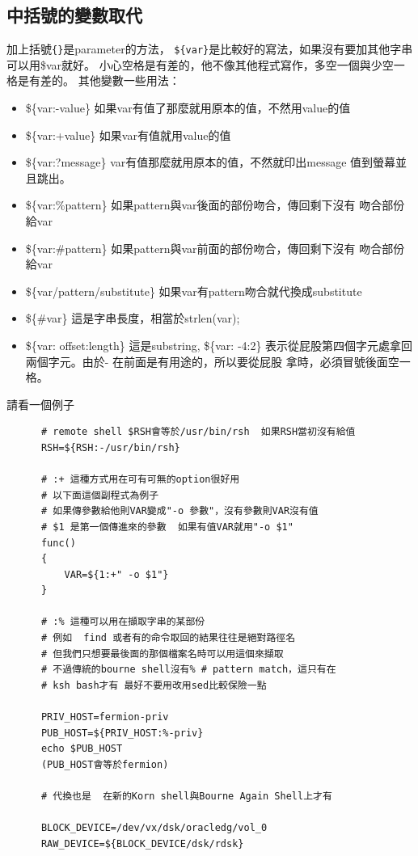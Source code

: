     \subsection{中括號的變數取代}
    加上括號\verb={}=是parameter的方法，
    \verb=${var}=是比較好的寫法，如果沒有要加其他字串可以用\$var就好。
    小心空格是有差的，他不像其他程式寫作，多空一個與少空一格是有差的。
    其他變數一些用法：
    \begin{itemize}
    \item \$\{var:-value\} 如果var有值了那麼就用原本的值，不然用value的值
    \item \$\{var:+value\} 如果var有值就用value的值
    \item \$\{var:?message\} var有值那麼就用原本的值，不然就印出message
      值到螢幕並且跳出。
    \item \$\{var:\%pattern\} 如果pattern與var後面的部份吻合，傳回剩下沒有
      吻合部份給var
    \item \$\{var:\#pattern\} 如果pattern與var前面的部份吻合，傳回剩下沒有
      吻合部份給var
    \item \$\{var/pattern/substitute\} 如果var有pattern吻合就代換成substitute
    \item \$\{\#var\} 這是字串長度，相當於strlen(var);
    \item \$\{var: offset:length\} 這是substring, \$\{var: -4:2\}
      表示從屁股第四個字元處拿回兩個字元。由於- 在前面是有用途的，所以要從屁股
      拿時，必須冒號後面空一格。
    \end{itemize}
    請看一個例子
    \begin{verbatim}
      # remote shell $RSH會等於/usr/bin/rsh  如果RSH當初沒有給值
      RSH=${RSH:-/usr/bin/rsh}

      # :+ 這種方式用在可有可無的option很好用
      # 以下面這個副程式為例子
      # 如果傳參數給他則VAR變成"-o 參數"，沒有參數則VAR沒有值
      # $1 是第一個傳進來的參數  如果有值VAR就用"-o $1"
      func()
      {
          VAR=${1:+" -o $1"}
      }

      # :% 這種可以用在擷取字串的某部份
      # 例如  find 或者有的命令取回的結果往往是絕對路徑名
      # 但我們只想要最後面的那個檔案名時可以用這個來擷取
      # 不過傳統的bourne shell沒有% # pattern match，這只有在
      # ksh bash才有 最好不要用改用sed比較保險一點

      PRIV_HOST=fermion-priv
      PUB_HOST=${PRIV_HOST:%-priv}
      echo $PUB_HOST
      (PUB_HOST會等於fermion)

      # 代換也是  在新的Korn shell與Bourne Again Shell上才有
      
      BLOCK_DEVICE=/dev/vx/dsk/oracledg/vol_0
      RAW_DEVICE=${BLOCK_DEVICE/dsk/rdsk}
    \end{verbatim}

